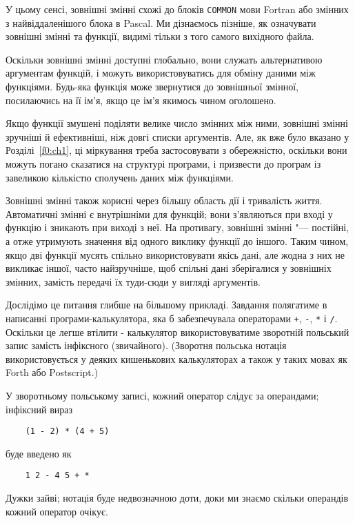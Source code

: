 \documentclass[a4paper,12pt]{book}
\begin{document}
  У цьому сенсі, зовнішні змінні схожі до блоків \texttt{COMMON} мови Fortran або
  змінних з найвіддаленішого блока в Pascal. Ми дізнаємось пізніше, як означувати зовнішні
  змінні та функції, видимі тільки з того самого вихідного файла.

  Оскільки зовнішні змінні доступні глобально, вони служать альтернативою аргументам
  функцій, і можуть використовуватись для обміну даними між функціями. Будь-яка функція
  може звернутися до зовнішньої змінної, посилаючись на її ім'я, якщо це ім'я
  якимось чином оголошено.

  Якщо функції змушені поділяти велике число змінних між ними, зовнішні змінні
  зручніші й ефективніші, ніж довгі списки аргументів. Але, як вже було вказано у
  Розділі~\ref{f0:ch1}, ці міркування треба застосовувати з обережністю, оскільки
  вони можуть погано сказатися на структурі програми, і призвести до програм із завеликою
  кількістю сполучень даних між функціями.

  Зовнішні змінні також корисні через більшу область дії і тривалість життя.
  Автоматичні змінні є внутрішніми для функцій; вони з'являються при вході у
  функцію і зникають при виході з неї. На противагу, зовнішні змінні "--- постійні, а отже
  утримують значення від одного виклику функції до іншого. Таким чином, якщо дві функції
  мусять спільно використовувати якісь дані, але жодна з них не викликає іншої, часто
  найзручніше, щоб спільні дані зберігалися у зовнішніх змінних, замість передачі їх
  туди-сюди у вигляді аргументів.

  Дослідімо це питання глибше на більшому прикладі. Завдання полягатиме в написанні
  програми-калькулятора, яка б забезпечувала операторами \texttt{+}, \texttt{-},
  \texttt{*} і \texttt{/}. Оскільки це легше втілити - калькулятор використовуватиме
  зворотній польський запис замість інфіксного (звичайного). (Зворотня польська нотація
  використовується у деяких кишенькових калькуляторах а також у таких мовах як Forth або
  Postscript.)

  У зворотньому польському записі, кожний оператор слідує за операндами; інфіксний
  вираз
  \begin{verbatim}
    (1 - 2) * (4 + 5)
  \end{verbatim}
  буде введено як
  \begin{verbatim}
    1 2 - 4 5 + *
  \end{verbatim}

  Дужки зайві; нотація буде недвозначною доти, доки ми знаємо скільки операндів кожний
  оператор очікує.
\end{document}
